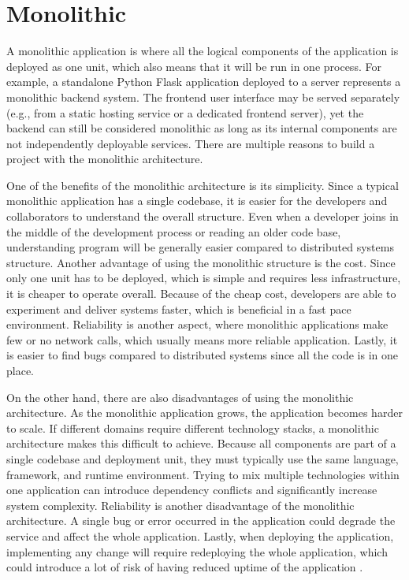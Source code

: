 \section[Monolithic]{Monolithic}
A monolithic application is where all the logical components of the application is deployed as one unit,
which also means that it will be run in one process. For example, a standalone Python Flask application deployed to a server represents a monolithic backend system.
The frontend user interface may be served separately (e.g., from a static hosting service or a dedicated frontend server),
yet the backend can still be considered monolithic as long as its internal components are not independently deployable services.
There are multiple reasons to build a project with the monolithic architecture.

One of the benefits of the monolithic architecture is its simplicity. Since a typical monolithic application has a single codebase, it is easier for
the developers and collaborators to understand the overall structure. Even when a developer joins in the middle of the development process or
reading an older code base, understanding program will be generally easier compared to distributed systems structure. Another advantage of using the monolithic
structure is the cost. Since only one unit has to be deployed, which is simple and requires less infrastructure, it is cheaper to operate overall.
Because of the cheap cost, developers are able to experiment and deliver systems faster, which is beneficial in a fast pace environment.
Reliability is another aspect, where monolithic applications make few or no network calls, which usually means more reliable application.
Lastly, it is easier to find bugs compared to distributed systems since all the code is in one place.

On the other hand, there are also disadvantages of using the monolithic architecture. As the monolithic application grows, the application becomes harder to scale.
If different domains require different technology stacks, a monolithic architecture makes this difficult to achieve. Because all components are part of a single codebase and deployment unit,
they must typically use the same language, framework, and runtime environment. Trying to mix multiple technologies within one application can introduce dependency conflicts
and significantly increase system complexity.
Reliability is another disadvantage of the monolithic architecture.
A single bug or error occurred in the application could degrade the service and affect the whole application.
Lastly, when deploying the application, implementing any change will require redeploying the whole application, which could introduce a lot of risk of having reduced uptime of the application \cite{Gandhi_Richards_Ford_2024}.

